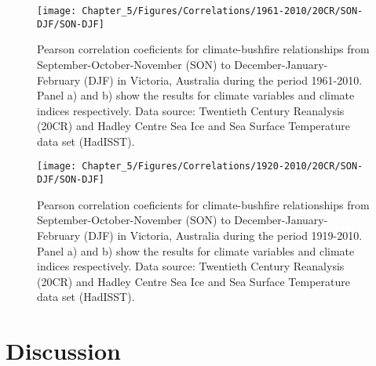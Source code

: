\begin{figure}[h]
\noindent \begin{centering}
\texttt{[image: Chapter\_5/Figures/Correlations/1961-2010/20CR/SON-DJF/SON-DJF]}
\par\end{centering}

\caption[Pearson correlation coeficients for climate-bushfire relationships
from September-October-November (SON) to December-January-February
(DJF) in Victoria, Australia during the period 1961-2010]{Pearson correlation coeficients for climate-bushfire relationships
from September-October-November (SON) to December-January-February
(DJF) in Victoria, Australia during the period 1961-2010. Panel a)
and b) show the results for climate variables and climate indices
respectively. Data source: Twentieth Century Reanalysis (20CR) and
Hadley Centre Sea Ice and Sea Surface Temperature data set (HadISST).\label{fig:Pearson correlation coeficients for climate-bushfire relationships from September-October-November to December-January-February in Victoria, Australia during the period 1961-2010}}
\end{figure}


\begin{figure}[h]
\noindent \begin{centering}
\texttt{[image: Chapter\_5/Figures/Correlations/1920-2010/20CR/SON-DJF/SON-DJF]}
\par\end{centering}

\caption[Pearson correlation coeficients for climate-bushfire relationships
from September-October-November (SON) to December-January-February
(DJF) in Victoria, Australia during the period 1919-2010]{Pearson correlation coeficients for climate-bushfire relationships
from September-October-November (SON) to December-January-February
(DJF) in Victoria, Australia during the period 1919-2010. Panel a)
and b) show the results for climate variables and climate indices
respectively. Data source: Twentieth Century Reanalysis (20CR) and
Hadley Centre Sea Ice and Sea Surface Temperature data set (HadISST).\label{fig:Pearson correlation coeficients for climate-bushfire relationships from September-October-November to December-January-February in Victoria, Australia during the period 1919-2010}}
\end{figure}



\section{Discussion}


